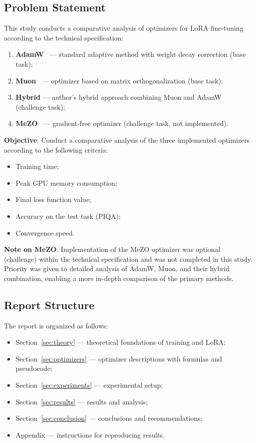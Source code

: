 \documentclass[a4paper,12pt]{article}
\begin{document}
\subsection{Problem Statement}

This study conducts a comparative analysis of optimizers for LoRA fine-tuning according to the technical specification:

\begin{enumerate}
    \item \textbf{AdamW}~\cite{loshchilov2019adamw} --- standard adaptive method with weight decay correction (base task);
    \item \textbf{Muon}~\cite{moonshot2024muon} --- optimizer based on matrix orthogonalization (base task);
    \item \textbf{Hybrid} --- author's hybrid approach combining Muon and AdamW (challenge task);
    \item \textbf{MeZO}~\cite{mezo2023} --- gradient-free optimizer (challenge task, not implemented).
\end{enumerate}

\textbf{Objective}: Conduct a comparative analysis of the three implemented optimizers according to the following criteria:
\begin{itemize}
    \item Training time;
    \item Peak GPU memory consumption;
    \item Final loss function value;
    \item Accuracy on the test task (PIQA);
    \item Convergence speed.
\end{itemize}

\textbf{Note on MeZO}: Implementation of the MeZO optimizer was optional (challenge) within the technical specification and was not completed in this study. Priority was given to detailed analysis of AdamW, Muon, and their hybrid combination, enabling a more in-depth comparison of the primary methods.

\subsection{Report Structure}

The report is organized as follows:
\begin{itemize}
    \item Section~\ref{sec:theory} --- theoretical foundations of training and LoRA;
    \item Section~\ref{sec:optimizers} --- optimizer descriptions with formulas and pseudocode;
    \item Section~\ref{sec:experiments} --- experimental setup;
    \item Section~\ref{sec:results} --- results and analysis;
    \item Section~\ref{sec:conclusion} --- conclusions and recommendations;
    \item Appendix --- instructions for reproducing results.
\end{itemize}
\newpage
\end{document}
